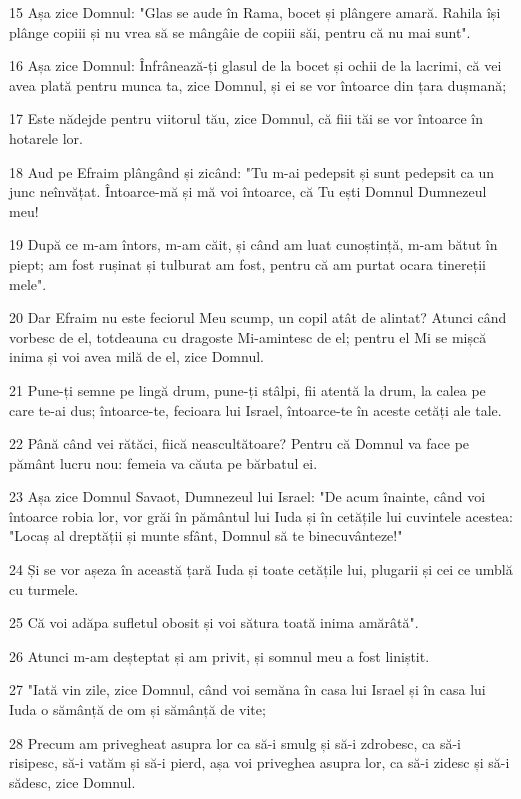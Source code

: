 \par 15 Așa zice Domnul: "Glas se aude în Rama, bocet și plângere amară. Rahila își plânge copiii și nu vrea să se mângâie de copiii săi, pentru că nu mai sunt".
\par 16 Așa zice Domnul: Înfrânează-ți glasul de la bocet și ochii de la lacrimi, că vei avea plată pentru munca ta, zice Domnul, și ei se vor întoarce din țara dușmană;
\par 17 Este nădejde pentru viitorul tău, zice Domnul, că fiii tăi se vor întoarce în hotarele lor.
\par 18 Aud pe Efraim plângând și zicând: "Tu m-ai pedepsit și sunt pedepsit ca un junc neînvățat. Întoarce-mă și mă voi întoarce, că Tu ești Domnul Dumnezeul meu!
\par 19 După ce m-am întors, m-am căit, și când am luat cunoștință, m-am bătut în piept; am fost rușinat și tulburat am fost, pentru că am purtat ocara tinereții mele".
\par 20 Dar Efraim nu este feciorul Meu scump, un copil atât de alintat? Atunci când vorbesc de el, totdeauna cu dragoste Mi-amintesc de el; pentru el Mi se mișcă inima și voi avea milă de el, zice Domnul.
\par 21 Pune-ți semne pe lingă drum, pune-ți stâlpi, fii atentă la drum, la calea pe care te-ai dus; întoarce-te, fecioara lui Israel, întoarce-te în aceste cetăți ale tale.
\par 22 Până când vei rătăci, fiică neascultătoare? Pentru că Domnul va face pe pământ lucru nou: femeia va căuta pe bărbatul ei.
\par 23 Așa zice Domnul Savaot, Dumnezeul lui Israel: "De acum înainte, când voi întoarce robia lor, vor grăi în pământul lui Iuda și în cetățile lui cuvintele acestea: "Locaș al dreptății și munte sfânt, Domnul să te binecuvânteze!"
\par 24 Și se vor așeza în această țară Iuda și toate cetățile lui, plugarii și cei ce umblă cu turmele.
\par 25 Că voi adăpa sufletul obosit și voi sătura toată inima amărâtă".
\par 26 Atunci m-am deșteptat și am privit, și somnul meu a fost liniștit.
\par 27 "Iată vin zile, zice Domnul, când voi semăna în casa lui Israel și în casa lui Iuda o sămânță de om și sămânță de vite;
\par 28 Precum am privegheat asupra lor ca să-i smulg și să-i zdrobesc, ca să-i risipesc, să-i vatăm și să-i pierd, așa voi priveghea asupra lor, ca să-i zidesc și să-i sădesc, zice Domnul.
